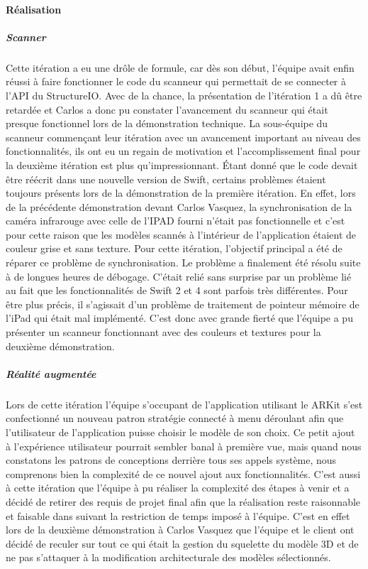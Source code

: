 \documentclass[rapport.tex]{subfiles}
\begin{document}
\paragraph*{Réalisation}
\subparagraph*{Scanner}
Cette itération a eu une drôle de formule, car dès son début, l’équipe avait enfin réussi à faire fonctionner le code du scanneur qui permettait de se connecter à l’API du StructureIO. Avec de la chance, la présentation de l’itération 1 a dû être retardée et Carlos a donc pu constater l’avancement du scanneur qui était presque fonctionnel lors de la démonstration technique. La sous-équipe du scanneur commençant leur itération avec un avancement important au niveau des fonctionnalités, ils ont eu un regain de motivation et l’accomplissement final pour la deuxième itération est plus qu’impressionnant. Étant donné que le code devait être réécrit dans une nouvelle version de Swift, certains problèmes étaient toujours présents lors de la démonstration de la première itération. En effet, lors de la précédente démonstration devant Carlos Vasquez, la synchronisation de la caméra infrarouge avec celle de l’IPAD fourni n’était pas fonctionnelle et c’est pour cette raison que les modèles scannés à l’intérieur de l’application étaient de couleur grise et sans texture. Pour cette itération, l’objectif principal a été de réparer ce problème de synchronisation. Le problème a finalement été résolu suite à de longues heures de débogage. C’était relié sans surprise par un problème lié au fait que les fonctionnalités de Swift 2 et 4 sont parfois très différentes. Pour être plus précis, il s’agissait d’un problème de traitement de pointeur mémoire de l’iPad qui était mal implémenté. C’est donc avec grande fierté que l’équipe a pu présenter un scanneur fonctionnant avec des couleurs et textures pour la deuxième démonstration.
\subparagraph*{Réalité augmentée}
Lors de cette itération l’équipe s’occupant de l’application utilisant le ARKit s’est confectionné un nouveau patron stratégie connecté à menu déroulant afin que l’utilisateur de l’application puisse choisir le modèle de son choix. Ce petit ajout à l’expérience utilisateur pourrait sembler banal à première vue, mais quand nous constatons les patrons de conceptions derrière tous ses appels système, nous comprenons bien la complexité de ce nouvel ajout aux fonctionnalités. C’est aussi à cette itération que l’équipe à pu réaliser la complexité des étapes à venir et a décidé de retirer des requis de projet final afin que la réalisation reste raisonnable et faisable dans suivant la restriction de temps imposé à l’équipe. C’est en effet lors de la deuxième démonstration à Carlos Vasquez que l’équipe et le client ont décidé de reculer sur tout ce qui était la gestion du squelette du modèle 3D et de ne pas s’attaquer à la modification architecturale des modèles sélectionnés.
\end{document}
